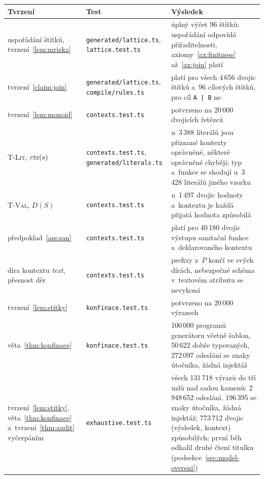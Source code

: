 \begin{table}[htbp]
    \centering
    \scriptsize
    \setlength{\extrarowheight}{1pt}
    \begin{tabularx}{\textwidth}{@{}>{\raggedright\arraybackslash}p{2.9cm}>{\raggedright\arraybackslash}p{4.2cm}Y@{}}
        \toprule
        \textbf{Tvrzení} & \textbf{Test} & \textbf{Výsledek} \\
        \midrule
        uspořádání štítků, tvrzení~\ref{lem:mrizka} & \texttt{generated/lattice.ts}, \texttt{lattice.test.ts} & úplný výčet 96 štítků: uspořádání odpovídá přiřaditelnosti, axiomy~\ref{ax:finitness} až~\ref{ax:join} platí \\
        tvrzení~\ref{claim:join} & \texttt{generated/lattice.ts}, \texttt{compile/rules.ts} & platí pro všech 4\,656 dvojic štítků a~96 cílových štítků, pro cíl \texttt{A | B} ne \\
        tvrzení~\ref{lem:monoid} & \texttt{contexts.test.ts} & potvrzeno na 20\,000 dvojicích řetězců \\
        \textsc{T-Lit}, $\mathit{ctx}(s)$ & \texttt{contexts.test.ts}, \texttt{generated/literals.ts} & u~3\,388 literálů jsou přiznané kontexty oprávněné, některé oprávněné chybějí; typ a~funkce se shodují u~3\,428 literálů jiného vzorku \\
        \textsc{T-Val}, $D(S)$ & \texttt{contexts.test.ts} & u~1\,497 dvojic hodnoty a~kontextu je každá přijatá hodnota způsobilá \\
        předpoklad~\ref{ass:san} & \texttt{contexts.test.ts} & platí pro 40\,180 dvojic výstupu sanitační funkce a~deklarovaného kontextu \\
        díra kontextu \emph{text}, přesnost děr & \texttt{contexts.test.ts} & prefixy z~$P$ končí ve svých dírách, nebezpečné schéma v~textovém atributu se nevykoná \\
        tvrzení~\ref{lem:stitky} & \texttt{konfinace.test.ts} & potvrzeno na 20\,000 výrazech \\
        věta~\ref{thm:konfinace} & \texttt{konfinace.test.ts} & 100\,000 programů generátoru včetně šablon, 50\,622 dobře typovaných, 272\,097 odeslání se znaky útočníka, žádná injektáž \\
        tvrzení~\ref{lem:stitky}, věta~\ref{thm:konfinace} a~tvrzení~\ref{thm:audit} vyčerpáním & \texttt{exhaustive.test.ts} & všech 131\,718 výrazů do tří uzlů nad sadou kamenů: 2\,948\,652 odeslání, 196\,395 se znaky útočníka, žádná injektáž; 773\,712 dvojic (výsledek, kontext) způsobilých; první běh odhalil druhé čtení titulku (podsekce~\ref{sec:model-overeni}) \\

\end{tabularx}
\end{table}
